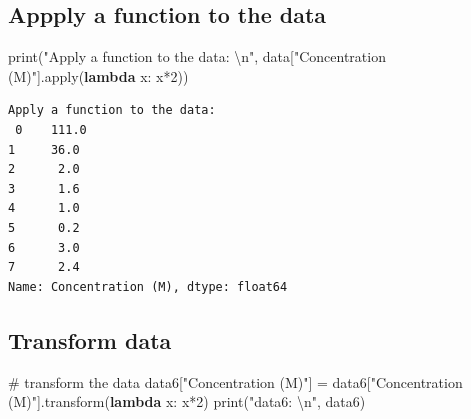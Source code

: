\documentclass[
  letterpaper,
  DIV=11,
  numbers=noendperiod]{scrreprt}
\newenvironment{Shaded}{\begin{snugshade}}{\end{snugshade}}
\newcommand{\BuiltInTok}[1]{\textcolor[rgb]{0.00,0.23,0.31}{#1}}
\newcommand{\CharTok}[1]{\textcolor[rgb]{0.13,0.47,0.30}{#1}}
\newcommand{\CommentTok}[1]{\textcolor[rgb]{0.37,0.37,0.37}{#1}}
\newcommand{\DecValTok}[1]{\textcolor[rgb]{0.68,0.00,0.00}{#1}}
\newcommand{\KeywordTok}[1]{\textcolor[rgb]{0.00,0.23,0.31}{\textbf{#1}}}
\newcommand{\NormalTok}[1]{\textcolor[rgb]{0.00,0.23,0.31}{#1}}
\newcommand{\OperatorTok}[1]{\textcolor[rgb]{0.37,0.37,0.37}{#1}}
\newcommand{\StringTok}[1]{\textcolor[rgb]{0.13,0.47,0.30}{#1}}
\begin{document}
\subsection*{Appply a function to the
data}\label{appply-a-function-to-the-data}

\begin{Shaded}
\begin{Highlighting}[]
\BuiltInTok{print}\NormalTok{(}\StringTok{"Apply a function to the data: }\CharTok{\textbackslash{}n}\StringTok{"}\NormalTok{, data[}\StringTok{"Concentration (M)"}\NormalTok{].}\BuiltInTok{apply}\NormalTok{(}\KeywordTok{lambda}\NormalTok{ x: x}\OperatorTok{*}\DecValTok{2}\NormalTok{))}
\end{Highlighting}
\end{Shaded}

\begin{verbatim}
Apply a function to the data: 
 0    111.0
1     36.0
2      2.0
3      1.6
4      1.0
5      0.2
6      3.0
7      2.4
Name: Concentration (M), dtype: float64
\end{verbatim}

\subsection*{Transform data}\label{transform-data}

\begin{Shaded}
\begin{Highlighting}[]
\CommentTok{\# transform the data}
\NormalTok{data6[}\StringTok{"Concentration (M)"}\NormalTok{] }\OperatorTok{=}\NormalTok{ data6[}\StringTok{"Concentration (M)"}\NormalTok{].transform(}\KeywordTok{lambda}\NormalTok{ x: x}\OperatorTok{*}\DecValTok{2}\NormalTok{)}
\BuiltInTok{print}\NormalTok{(}\StringTok{"data6: }\CharTok{\textbackslash{}n}\StringTok{"}\NormalTok{, data6)}
\end{Highlighting}
\end{Shaded}
\end{document}
